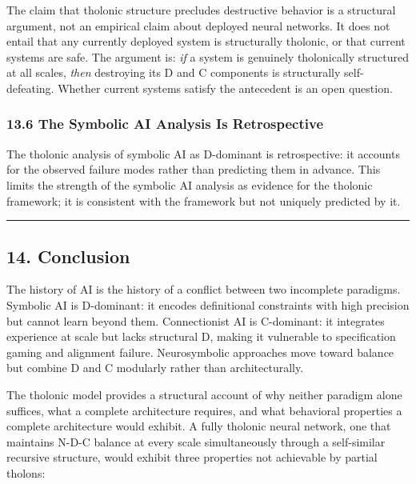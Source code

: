 \documentclass[
  11pt,
  letterpaper,
]{article}
\begin{document}
The claim that tholonic structure precludes destructive behavior is a
structural argument, not an empirical claim about deployed neural
networks. It does not entail that any currently deployed system is
structurally tholonic, or that current systems are safe. The argument
is: \emph{if} a system is genuinely tholonically structured at all
scales, \emph{then} destroying its D and C components is structurally
self-defeating. Whether current systems satisfy the antecedent is an
open question.

\subsubsection{13.6 The Symbolic AI Analysis Is
Retrospective}\label{the-symbolic-ai-analysis-is-retrospective}

The tholonic analysis of symbolic AI as D-dominant is retrospective: it
accounts for the observed failure modes rather than predicting them in
advance. This limits the strength of the symbolic AI analysis as
evidence for the tholonic framework; it is consistent with the framework
but not uniquely predicted by it.

\begin{center}\rule{0.5\linewidth}{0.5pt}\end{center}

\subsection{14. Conclusion}\label{conclusion}

The history of AI is the history of a conflict between two incomplete
paradigms. Symbolic AI is D-dominant: it encodes definitional
constraints with high precision but cannot learn beyond them.
Connectionist AI is C-dominant: it integrates experience at scale but
lacks structural D, making it vulnerable to specification gaming and
alignment failure. Neurosymbolic approaches move toward balance but
combine D and C modularly rather than architecturally.

The tholonic model provides a structural account of why neither paradigm
alone suffices, what a complete architecture requires, and what
behavioral properties a complete architecture would exhibit. A fully
tholonic neural network, one that maintains N-D-C balance at every scale
simultaneously through a self-similar recursive structure, would exhibit
three properties not achievable by partial tholons:
\end{document}
